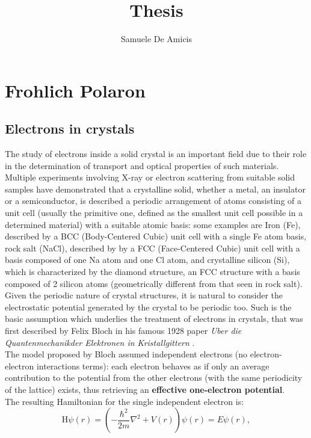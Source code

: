 \documentclass[12pt, a4paper]{report}
\title{Thesis}
\author{Samuele De Amicis}
\numberwithin{equation}{section}
\begin{document}
\maketitle

\chapter{Frohlich Polaron}
\section{Electrons in crystals}
The study of electrons inside a solid crystal is an important field due to their role in the determination of transport
and optical properties of such materials.\\
Multiple experiments involving X-ray or electron scattering from suitable solid samples have demonstrated that a crystalline solid, 
whether a metal, an insulator or a semiconductor, is described a periodic arrangement of atoms consisting of a unit cell 
(usually the primitive one, defined as the smallest unit cell possible in a determined material) with a suitable 
atomic basis: some examples are Iron (Fe), described by a BCC (Body-Centered Cubic) unit cell with a single Fe atom basis, 
rock salt (NaCl), described by by a FCC (Face-Centered Cubic) unit cell with a basis composed of one Na atom and one Cl atom, and 
crystalline silicon (Si), which is characterized by the diamond structure, an FCC structure with a basis composed of 2 silicon atoms 
(geometrically different from that seen in rock salt). \\
Given the periodic nature of crystal structures, it is natural to consider the electrostatic potential generated by the crystal to 
be periodic too. Such is the basic assumption which underlies the treatment of electrons in crystals, that was first described by 
Felix Bloch in his famous 1928 paper \textit{Uber die Quantenmechanikder Elektronen in Kristallgittern} \cite{bloch1928quantum}.\\
The model proposed by Bloch assumed independent electrons (no electron-electron interactions terms): each electron behaves as 
if only an average contribution to the potential from the other electrons (with the same periodicity of the lattice) exists, thus 
retrieving an \textbf{effective one-electron potential}.\\
The resulting Hamiltonian for the single independent electron is:
\begin{equation}
    \mathrm{H}\psi(r)=\left(-\frac{\hbar^2}{2m}\nabla^2+V(r)\right)\psi(r)=E\psi(r),
    \label{eq_0_00}
\end{equation}
\end{document}
